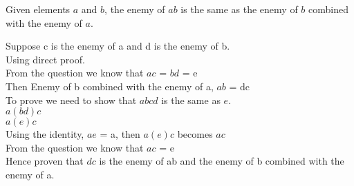 \documentclass[a4paper]{exam}
\begin{document}
\begin{questions}
\begin{parts}
\begin{solution}
    \end{solution}
  \item Given elements $a$ and $b$, the enemy of $ab$ is the same as the enemy of $b$ combined with the enemy of $a$.
    \begin{solution}
     
     Suppose c is the enemy of a and d is the enemy of b.\\
     Using direct proof.\\
     From the question we know that $ac$ = $bd$ = e\\
     Then Enemy of b combined with the enemy of a, $ab$ = dc\\
     To prove we need to show that $abcd$ is the same as $e$.\\
     $a(bd)c$\\
     $a(e)c$\\
     Using the identity, $ae$ = a, then   $a(e)c$ becomes $ac$\\
    From the question we know that $ac$ = e \\
    Hence proven that $dc$ is the enemy of ab and the enemy of b combined with the enemy of a.
    \end{solution}
  \end{parts}

\end{questions}
\end{document}
